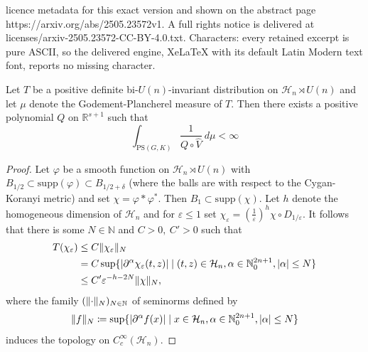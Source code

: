 \documentclass[10pt,a4paper]{amsart}
\DeclarePairedDelimiter{\abs}{\lvert}{\rvert}
\DeclarePairedDelimiter{\norm}{\lVert}{\rVert}
\newcommand{\N}{\mathbb{N}}
\newcommand{\R}{\mathbb{R}}
\renewcommand{\epsilon}{\varepsilon}
\renewcommand{\phi}{\varphi}
\begin{document}
licence metadata for this exact version and shown on the abstract page https://arxiv.org/abs/2505.23572v1. A full rights notice is delivered at licenses/arxiv-2505.23572-CC-BY-4.0.txt. Characters: every retained excerpt is pure ASCII, so the delivered engine, XeLaTeX with its default Latin Modern text font, reports no missing character.
\begin{lemma}\label{l:polynomial_growth_Godement_Plancherel_measure_Heisenberg}
	Let $T$ be a positive definite bi-$U(n)$-invariant distribution on $\mathcal{H}_n\rtimes U(n)$ and let $\mu$ denote the Godement-Plancherel measure of $T$.
	Then there exists a positive polynomial $Q$ on $\R^{s+1}$ such that 
	\[
	\int_{\mathrm{PS}(G, K)} \frac{1}{Q\circ\widehat{V}} \ d\mu<\infty
	\]
\end{lemma}

\begin{proof}
	Let $\phi$ be a smooth function on $\mathcal{H}_n\rtimes U(n)$ with $B_{1/2}\subset \mathrm{supp}(\phi)\subset B_{1/2+\delta}$ (where the balls are with respect to the Cygan-Koranyi metric) and set 
	$\chi = \phi*\phi^*$. Then $B_{1}\subset \mathrm{supp}(\chi)$.
	Let $h$ denote the homogeneous dimension of $\mathcal{H}_n$ and
	for $\epsilon\leq 1$ set $\chi_\epsilon = \left(\frac{1}{\varepsilon}\right)^h\chi\circ D_{1/\varepsilon}$.
	It follows that there is some $N\in \N$ and $C>0,\ C'>0$ such that
	\begin{align*}
		T(\chi_\varepsilon) &\leq C \norm{\chi_\varepsilon}_N\\
		&= C\sup\{\abs{\partial^\alpha\chi_\epsilon(t,z)}\mid (t,z)\in \mathcal{H}_n, \alpha\in \mathbb{N}_0^{2n+1},\abs{\alpha}\leq N\}\\
		&\leq C'\epsilon^{-h-2N}\norm{\chi}_N,
	\end{align*}
	where the family $(\norm{\cdot}_N)_{N\in \N}$ of seminorms defined by
	\[\norm{f}_N\coloneqq\sup\{\abs{\partial^\alpha f(x)}\mid x\in \mathcal{H}_n, \alpha\in \mathbb{N}_0^{2n+1},\abs{\alpha}\leq N\}\]
	induces the topology on $C_c^\infty(\mathcal{H}_n)$.
		

\end{proof}
\end{document}

